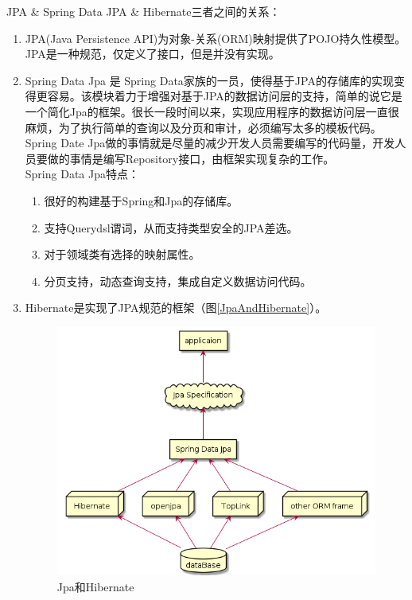JPA \& Spring Data JPA \& Hibernate三者之间的关系：
\begin{enumerate}
    \item JPA(Java Persistence API)为对象-关系(ORM)映射提供了POJO持久性模型。JPA是一种规范，仅定义了接口，但是并没有实现。
    \item Spring Data Jpa 是 Spring Data家族的一员，使得基于JPA的存储库的实现变得更容易。该模块着力于增强对基于JPA的数据访问层的支持，简单的说它是一个简化Jpa的框架。很长一段时间以来，实现应用程序的数据访问层一直很麻烦，为了执行简单的查询以及分页和审计，必须编写太多的模板代码。Spring Date Jpa做的事情就是尽量的减少开发人员需要编写的代码量，开发人员要做的事情是编写Repository接口，由框架实现复杂的工作。\\
          Spring Data Jpa特点：
          \begin{enumerate}
              \item 很好的构建基于Spring和Jpa的存储库。
              \item 支持Querydsl谓词，从而支持类型安全的JPA差选。
              \item 对于领域类有选择的映射属性。
              \item 分页支持，动态查询支持，集成自定义数据访问代码。
          \end{enumerate}
    \item Hibernate是实现了JPA规范的框架（图\ref{JpaAndHibernate}）。
          \begin{figure}[h]
              \centering
              \includegraphics[scale = 0.6]{out/uml/部署图/Jpa和Hibernate/Jpa和Hibernate.png}
              \caption{\song\wuhao Jpa和Hibernate}

\end{figure}
\end{enumerate}
